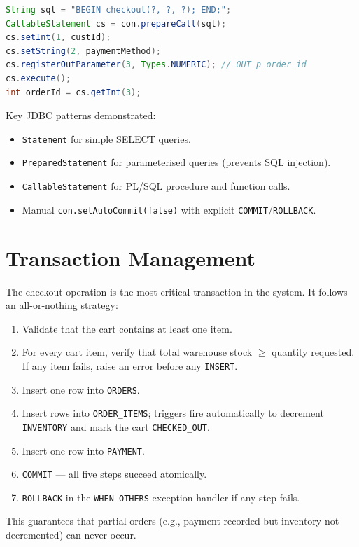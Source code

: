 \documentclass[12pt, a4paper]{article}
\begin{document}
\begin{lstlisting}[language=Java, caption={Calling the checkout PL/SQL procedure}]
String sql = "BEGIN checkout(?, ?, ?); END;";
CallableStatement cs = con.prepareCall(sql);
cs.setInt(1, custId);
cs.setString(2, paymentMethod);
cs.registerOutParameter(3, Types.NUMERIC); // OUT p_order_id
cs.execute();
int orderId = cs.getInt(3);
\end{lstlisting}

Key JDBC patterns demonstrated:
\begin{itemize}
    \item \texttt{Statement} for simple SELECT queries.
    \item \texttt{PreparedStatement} for parameterised queries (prevents SQL injection).
    \item \texttt{CallableStatement} for PL/SQL procedure and function calls.
    \item Manual \texttt{con.setAutoCommit(false)} with explicit \texttt{COMMIT}/\texttt{ROLLBACK}.
\end{itemize}


\section{Transaction Management}


The checkout operation is the most critical transaction in the system. It follows an
all-or-nothing strategy:

\begin{enumerate}
    \item Validate that the cart contains at least one item.
    \item For every cart item, verify that total warehouse stock $\geq$ quantity
          requested. If any item fails, raise an error before any \texttt{INSERT}.
    \item Insert one row into \texttt{ORDERS}.
    \item Insert rows into \texttt{ORDER\_ITEMS}; triggers fire automatically to
          decrement \texttt{INVENTORY} and mark the cart \texttt{CHECKED\_OUT}.
    \item Insert one row into \texttt{PAYMENT}.
    \item \texttt{COMMIT} — all five steps succeed atomically.
    \item \texttt{ROLLBACK} in the \texttt{WHEN OTHERS} exception handler if any step fails.
\end{enumerate}

This guarantees that partial orders (e.g., payment recorded but inventory not
decremented) can never occur.
\end{document}
